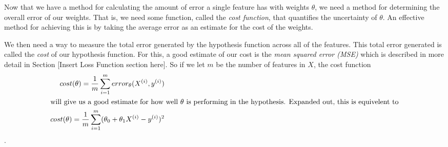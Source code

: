 Now that we have a method for calculating the amount of error a single feature has with weights $\theta$, we need a method for determining the overall error of our weights. That is, we need some function, called the \emph{cost function}, that quantifies the uncertainty of $\theta$. An effective method for achieving this is by taking the average error as an estimate for the cost of the weights. 

We then need a way to measure the total error generated by the hypothesis
function across all of the features. This total error generated is called the
\emph{cost} of our hypothesis function. For this, a good estimate of our cost is
the \emph{mean squared error (MSE)} which is described in more detail in Section
[Insert Loss Function section here]. So if we let $m$ be the number of features
in $X$, the cost function
\begin{subequations}
    \begin{align}
        cost(\theta) = \frac{1}{m}\sum_{i=1}^m error_{\theta}(X^{(i)}, y^{(i)}) \\
    \intertext{will give us a good estimate for how well $\theta$ is performing in the hypothesis. Expanded out, this is equivelent to}
        cost(\theta) = \frac{1}{m}\sum_{i=1}^m (\theta_0 + \theta_1X^{(i)} -
        y^{(i)})^2
    \end{align}
\end{subequations}
.

